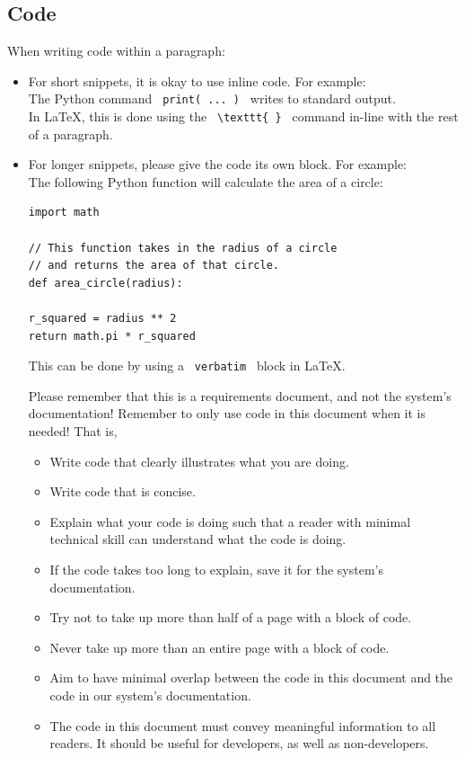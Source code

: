\documentclass{scrreprt}
\begin{document}
\subsection{Code}
When writing code within a paragraph:
\begin{itemize}
\item For short snippets, it is okay to use inline code. For example: \\
The \gls{Python} command \texttt{ print( ... ) } writes to standard output. \\
In \gls{LaTeX}, this is done using the \texttt{ \textbackslash texttt\{ \} } command in-line with the rest of a paragraph.
\item For longer snippets, please give the code its own block. For example: \\
The following \gls{Python} function will calculate the area of a circle: \\
\begin {verbatim}
import math

// This function takes in the radius of a circle
// and returns the area of that circle.
def area_circle(radius):

r_squared = radius ** 2
return math.pi * r_squared
\end{verbatim}
This can be done by using a \texttt{ verbatim } block in \gls{LaTeX}.  

Please remember that this is a requirements document, and not the system's documentation!
Remember to only use code in this document when it is needed!
That is,
\begin{itemize}
    \item Write code that clearly illustrates what you are doing.
    \item Write code that is concise.
    \item Explain what your code is doing such that a reader with minimal technical skill can understand what the code is doing.
    \item If the code takes too long to explain, save it for the system's documentation.
    \item Try not to take up more than half of a page with a block of code.
    \item Never take up more than an entire page with a block of code.
    \item Aim to have minimal overlap between the code in this document and the code in our system's documentation.
    \item The code in this document must convey meaningful information to all readers.
          It should be useful for developers, as well as non-developers.
\end{itemize}
\end{itemize}
$ $
\end{document}
